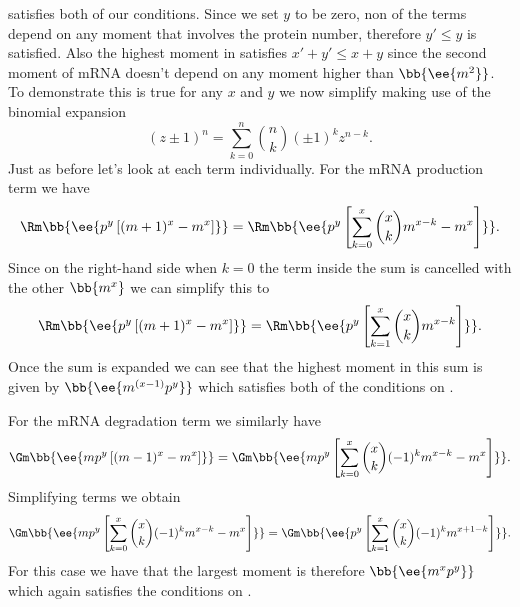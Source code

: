  satisfies both of our conditions. Since we set $y$ to
be zero, non of the terms depend on any moment that involves the protein number,
therefore $y' \leq y$ is satisfied. Also the highest moment in
  satisfies $x' + y' \leq x + y$ since the second
moment of mRNA doesn't depend on any moment higher than $\bb{\ee{m^2}}$. To
demonstrate this is true for any $x$ and $y$ we now simplify
 making use of the binomial expansion
\begin{equation}
  (z \pm 1)^n = \sum_{k=0}^n {n \choose k} (\pm 1)^{k} z^{n-k}.
\end{equation}
Just as before let's look at each term individually. For the mRNA production
term we have
\begin{equation}
  \Rm \bb{\ee{p^y \left[ (m + 1)^x -m^x \right]}} =
  \Rm \bb{\ee{p^y \left[ \sum_{k=0}^x {x \choose k} m^{x-k} - m^x \right]}}.
\end{equation}
Since on the right-hand side when $k=0$ the term inside the sum is cancelled with the other $\bb{m^x}$ we can simplify
this to
\begin{equation}
  \Rm \bb{\ee{p^y \left[ (m + 1)^x -m^x \right]}} =
  \Rm \bb{\ee{p^y \left[ \sum_{k=1}^x {x \choose k} m^{x-k} \right]}}.
\end{equation}
Once the sum is expanded we can see that the highest moment in this sum is given
by $\bb{\ee{m^{(x-1)} p^y}}$ which satisfies both of the conditions on
.

For the mRNA degradation term we similarly have
\begin{equation}
  \Gm \bb{\ee{m p^y \left[ (m - 1)^x - m^x \right]}} =
  \Gm \bb{\ee{m p^y \left[ \sum_{k=0}^x {x \choose k}(-1)^k m^{x-k} -
                          m^x \right]}}.
\end{equation}
Simplifying terms we obtain
\begin{equation}
  \Gm \bb{\ee{m p^y \left[ \sum_{k=0}^x {x \choose k}(-1)^k m^{x-k} -
                          m^x \right]}} =
  \Gm \bb{\ee{p^y \left[ \sum_{k=1}^x {x \choose k}(-1)^k m^{x+1-k} \right]}}.
\end{equation}
For this case we have that the largest moment is therefore $\bb{\ee{m^x p^y }}$
which again satisfies the conditions on .

